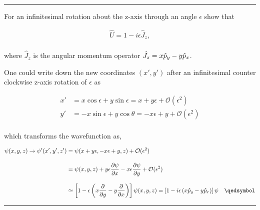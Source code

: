 \noindent\rule{7in}{1.5pt}


\begin{problem}{9.2}
    For an infinitesimal rotation about the z-axis through an angle $\epsilon$ show that

    \begin{align*}
        \hat{U} = 1-i\epsilon \hat{J}_z,
    \end{align*}\\
    where $\hat{J}_z$ is the angular momentum operator $\hat{J}_z = x \hat{p}_y - y\hat{p}_x $. 
\end{problem}
\begin{solution}
One could write down the new coordinates $(x',y')$ after an infinitesimal counter clockwise z-axis rotation of $\epsilon$ as 

\begin{align*}
    x' &= x \cos \epsilon + y \sin \epsilon = x + y \epsilon + \mathcal{O}(\epsilon^2) \\[0.1in]
    y' &= - x\sin \epsilon + y \cos \theta = -x \epsilon + y + \mathcal{O}(\epsilon^2) 
\end{align*}\\
which transforms the wavefunction as, 

\begin{align*}
    \psi(x,y,z) \to \psi'(x',y',z') &= \psi(x+y\epsilon,-x\epsilon+y,z) + \mathcal{O}(\epsilon^2) \\[0.135in]
    &= \psi(x,y,z) + y\epsilon \pder{\psi}{x} - x\epsilon \pder{\psi}{y} + \mathcal{O}(\epsilon^2) \\[0.12in]
    &\simeq \left[  1 - \epsilon \left( x \pder{}{y} - y \pder{}{x} \right) \right] \psi(x,y,z) = \left[ 1-i\epsilon \left( x \hatp_y - y \hatp_x \right) \right] \psi  \qed 
\end{align*}
\end{solution}

\noindent\rule{7in}{1.5pt}


